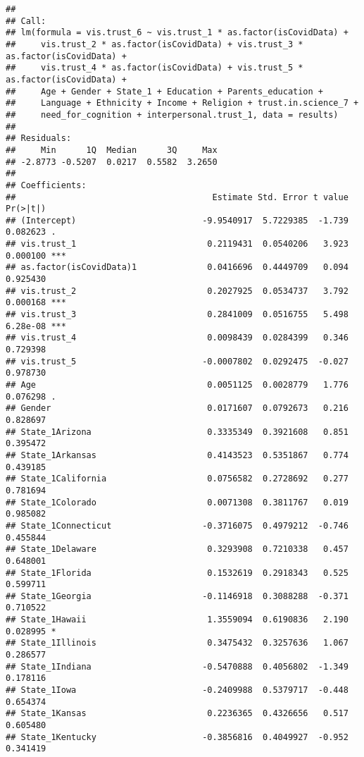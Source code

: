 \documentclass[
]{article}
\begin{document}
\begin{verbatim}
## 
## Call:
## lm(formula = vis.trust_6 ~ vis.trust_1 * as.factor(isCovidData) + 
##     vis.trust_2 * as.factor(isCovidData) + vis.trust_3 * as.factor(isCovidData) + 
##     vis.trust_4 * as.factor(isCovidData) + vis.trust_5 * as.factor(isCovidData) + 
##     Age + Gender + State_1 + Education + Parents_education + 
##     Language + Ethnicity + Income + Religion + trust.in.science_7 + 
##     need_for_cognition + interpersonal.trust_1, data = results)
## 
## Residuals:
##     Min      1Q  Median      3Q     Max 
## -2.8773 -0.5207  0.0217  0.5582  3.2650 
## 
## Coefficients:
##                                       Estimate Std. Error t value Pr(>|t|)    
## (Intercept)                         -9.9540917  5.7229385  -1.739 0.082623 .  
## vis.trust_1                          0.2119431  0.0540206   3.923 0.000100 ***
## as.factor(isCovidData)1              0.0416696  0.4449709   0.094 0.925430    
## vis.trust_2                          0.2027925  0.0534737   3.792 0.000168 ***
## vis.trust_3                          0.2841009  0.0516755   5.498 6.28e-08 ***
## vis.trust_4                          0.0098439  0.0284399   0.346 0.729398    
## vis.trust_5                         -0.0007802  0.0292475  -0.027 0.978730    
## Age                                  0.0051125  0.0028779   1.776 0.076298 .  
## Gender                               0.0171607  0.0792673   0.216 0.828697    
## State_1Arizona                       0.3335349  0.3921608   0.851 0.395472    
## State_1Arkansas                      0.4143523  0.5351867   0.774 0.439185    
## State_1California                    0.0756582  0.2728692   0.277 0.781694    
## State_1Colorado                      0.0071308  0.3811767   0.019 0.985082    
## State_1Connecticut                  -0.3716075  0.4979212  -0.746 0.455844    
## State_1Delaware                      0.3293908  0.7210338   0.457 0.648001    
## State_1Florida                       0.1532619  0.2918343   0.525 0.599711    
## State_1Georgia                      -0.1146918  0.3088288  -0.371 0.710522    
## State_1Hawaii                        1.3559094  0.6190836   2.190 0.028995 *  
## State_1Illinois                      0.3475432  0.3257636   1.067 0.286577    
## State_1Indiana                      -0.5470888  0.4056802  -1.349 0.178116    
## State_1Iowa                         -0.2409988  0.5379717  -0.448 0.654374    
## State_1Kansas                        0.2236365  0.4326656   0.517 0.605480    
## State_1Kentucky                     -0.3856816  0.4049927  -0.952 0.341419    

\end{verbatim}
\end{document}
